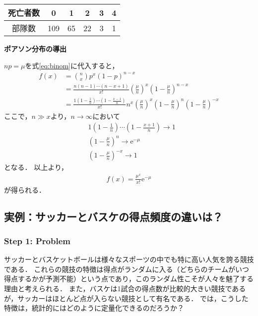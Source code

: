 %
\begin{table}[H]
    \centering
    \caption{}
    \label{tb:poisson_ex}
    \begin{tabular}{c|ccccc}
    \hline
        死亡者数 & 0 & 1 & 2 & 3 & 4 \\ \hline
        部隊数 & 109 & 65 & 22 & 3 & 1 \\ \hline
    \end{tabular}
\end{table}
%

\vspace{0.5cm}
\noindent\textbf{ポアソン分布の導出}\\
\noindent\hrulefill

$ np=\mu $を式\eqref{eq:binom}に代入すると，
%
\begin{align*}
	f(x)
	&= \binom{n}{x} p^{x}(1-p)^{n-x} \\
	&= \frac{n(n-1)\cdots(n-x+1)}{x!} \left(\frac{\mu}{n}\right)^{x}\left( 1- \frac{\mu}{n}\right)^{n-x}  \\[8pt]
	          &= \frac{1(1-\frac{1}{n})\cdots(1-\frac{x-1}{n})}{x!} n^{x} \left(\frac{\mu}{n} \right)^{x} \left( 1- \frac{\mu}{n} \right)^{n} \left( 1- \frac{\mu}{n} \right)^{-x}
\end{align*}
%
ここで，$ n \gg x $より，$ n\to \infty $において
%
\begin{align*}
	&1(1-\frac{1}{n})\cdots(1-\frac{x+1}{n}) \to 1 \\[10pt]
	&\left( 1- \frac{\mu}{n} \right)^{n} \to \mathrm{e}^{-\mu} \\[10pt]
	&\left( 1- \frac{\mu}{n} \right)^{-x} \to 1
\end{align*}
%
となる．
%
以上より，
%
\begin{align*}
	f(x) = \frac{\mu^{x}}{x!} \mathrm{e}^{-\mu}
\end{align*}
%
が得られる．

\clearpage
\subsection{実例：サッカーとバスケの得点頻度の違いは？}

\subsubsection*{Step 1: Problem}
%
サッカーとバスケットボールは様々なスポーツの中でも特に高い人気を誇る競技である．
%
これらの競技の特徴は得点がランダムに入る（どちらのチームがいつ得点するかが予測不能）という点であり，このランダム性こそが人々を魅了する理由と考えられる．
%
また，バスケは1試合の得点数が比較的大きい競技であるが，サッカーはほとんど点が入らない競技として有名である．
%
では，こうした特徴は，統計的にはどのように定量化できるのだろうか？
%

